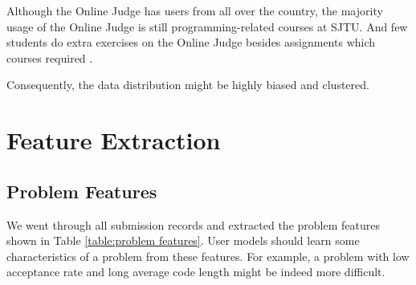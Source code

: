     Although the Online Judge has users from all over the country,
    the majority usage of the Online Judge is still programming-related courses at SJTU.
    And few students do extra exercises on the Online Judge besides assignments which courses required .

    Consequently, the data distribution might be highly biased and clustered.

\section{Feature Extraction}

    \subsection{Problem Features}

        We went through all submission records and extracted the problem features shown in Table \ref{table:problem features}.
        User models should learn some characteristics of a problem from these features.
        For example, a problem with low acceptance rate and long average code length might be indeed more difficult.

